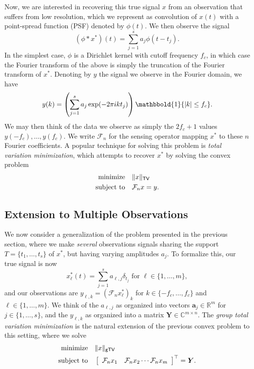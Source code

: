 \documentclass[11pt]{article}
\newcommand{\RR}{\mathbb{R}}
\newcommand{\CC}{\mathbb{C}}
\newcommand{\One}{\mathbbold{1}}
\newcommand{\sF}{\mathcal{F}}
\newcommand{\HS}{\hspace{3.5mm}}
\newcommand{\bY}{\bm Y}
\newcommand{\ba}{\bm a}
\begin{document}
Now, we are interested in recovering this true signal $x$ from an observation that suffers from low resolution, which we represent as convolution of $x(t)$ with a point-spread function (PSF) denoted by $\phi(t)$.
We then observe the signal
\begin{equation}
    (\phi * x^*)(t) = \sum_{j = 1}^sa_j \phi(t - t_j).
\end{equation}
In the simplest case, $\phi$ is a Dirichlet kernel with cutoff frequency $f_c$, in which case the Fourier transform of the above is simply the truncation of the Fourier transform of $x^*$.
Denoting by $y$ the signal we observe in the Fourier domain, we have
\begin{equation}
    y(k) = \left(\sum_{j = 1}^s a_j \exp(-2\pi i k t_j)\right)\One\{|k| \leq f_c \}.
\end{equation}
We may then think of the data we observe as simply the $2f_c + 1$ values $y(-f_c), \dots, y(f_c)$.
We write $\sF_n$ for the sensing operator mapping $x^*$ to these $n$ Fourier coefficients.
A popular technique for solving this problem is \emph{total variation minimization}, which attempts to recover $x^*$ by solving the convex problem
\begin{equation}
\begin{aligned}
  \text{minimize} &\HS \|x\|_{\mathsf{TV}} \\
  \text{subject to} &\HS \sF_nx = y.
\end{aligned}
\end{equation}

\subsection{Extension to Multiple Observations}

We now consider a generalization of the problem presented in the previous section, where we make \emph{several} observations signals sharing the support $T = \{t_1, \dots, t_s\}$ of $x^*$, but having varying amplitudes $a_j$.
To formalize this, our true signal is now
\begin{equation}
    x^*_\ell(t) = \sum_{j = 1}^s a_{\ell, j} \delta_{t_j} \text{ for } \ell \in \{1, \dots, m\},
\end{equation}
and our observations are $y_{\ell, k} = (\sF_n x^*_\ell)_{k}$ for $k \in \{-f_c, \dots, f_c\}$ and $\ell \in \{1, \dots, m\}$.
We think of the $a_{\ell, j}$ as organized into vectors $\ba_{j} \in \RR^m$ for $j \in \{1, \dots, s\}$, and the  $y_{\ell, k}$ as organized into a matrix $\bY \in \CC^{m \times n}$.
The \emph{group total variation minimization} is the natural extension of the previous convex problem to this setting, where we solve
\begin{equation}
\begin{aligned}
  \text{minimize} &\HS \|x\|_{\mathsf{gTV}} \\
  \text{subject to} &\HS \left[\begin{array}{cccc}\sF_nx_1 & \sF_n x_2 \cdots \sF_n x_m \end{array}\right]^\top = \bY.
\end{aligned}
\end{equation}
\end{document}
